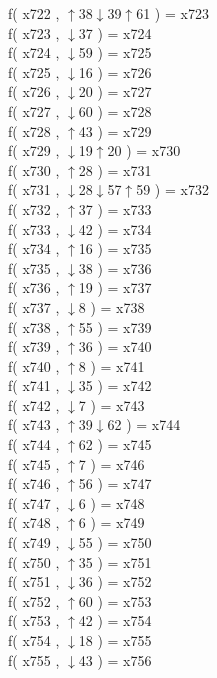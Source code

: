 f( x722 , $\uparrow$38$\downarrow$39$\uparrow$61 ) = x723 \\
f( x723 , $\downarrow$37 ) = x724 \\
f( x724 , $\downarrow$59 ) = x725 \\
f( x725 , $\downarrow$16 ) = x726 \\
f( x726 , $\downarrow$20 ) = x727 \\
f( x727 , $\downarrow$60 ) = x728 \\
f( x728 , $\uparrow$43 ) = x729 \\
f( x729 , $\downarrow$19$\uparrow$20 ) = x730 \\
f( x730 , $\uparrow$28 ) = x731 \\
f( x731 , $\downarrow$28$\downarrow$57$\uparrow$59 ) = x732 \\
f( x732 , $\uparrow$37 ) = x733 \\
f( x733 , $\downarrow$42 ) = x734 \\
f( x734 , $\uparrow$16 ) = x735 \\
f( x735 , $\downarrow$38 ) = x736 \\
f( x736 , $\uparrow$19 ) = x737 \\
f( x737 , $\downarrow$8 ) = x738 \\
f( x738 , $\uparrow$55 ) = x739 \\
f( x739 , $\uparrow$36 ) = x740 \\
f( x740 , $\uparrow$8 ) = x741 \\
f( x741 , $\downarrow$35 ) = x742 \\
f( x742 , $\downarrow$7 ) = x743 \\
f( x743 , $\uparrow$39$\downarrow$62 ) = x744 \\
f( x744 , $\uparrow$62 ) = x745 \\
f( x745 , $\uparrow$7 ) = x746 \\
f( x746 , $\uparrow$56 ) = x747 \\
f( x747 , $\downarrow$6 ) = x748 \\
f( x748 , $\uparrow$6 ) = x749 \\
f( x749 , $\downarrow$55 ) = x750 \\
f( x750 , $\uparrow$35 ) = x751 \\
f( x751 , $\downarrow$36 ) = x752 \\
f( x752 , $\uparrow$60 ) = x753 \\
f( x753 , $\uparrow$42 ) = x754 \\
f( x754 , $\downarrow$18 ) = x755 \\
f( x755 , $\downarrow$43 ) = x756 \\
